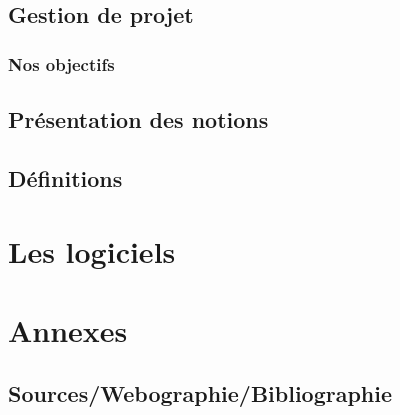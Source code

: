 \documentclass[a4paper,12pt,one side,titlepage]{report}
\begin{document}
\chapter{Gestion de projet}
\lipsum

\section{Nos objectifs}
\lipsum
\chapter{Présentation des notions}
\chapter{Définitions}

\part{Les logiciels}



\part{Annexes}
\chapter{Sources/Webographie/Bibliographie}



\printglossaries
\end{document}
